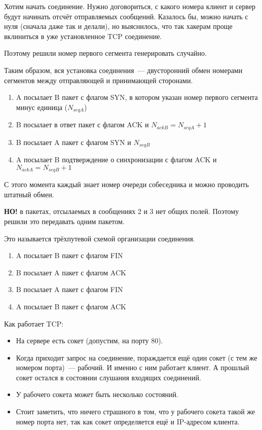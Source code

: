 
Хотим начать соединение. Нужно договориться, с какого номера клиент и сервер будут начинать отсчёт отправляемых сообщений. Казалось бы, можно начать с нуля (сначала даже так и делали), но выяснилось, что так хакерам проще вклиниться в уже установленное TCP соединение.

Поэтому решили номер первого сегмента генерировать случайно. 

Таким образом, вся установка соединения~--- двусторонний обмен номерами сегментов между отправляющей и принимающей сторонами.

\begin{enumerate}
    \item A посылает B пакет с флагом SYN, в котором указан номер первого сегмента минус единица ($N_{seqA}$)
    \item B посылает в ответ пакет с флагом ACK и $N_{ackB}=N_{seqA}+1$
    \item B посылает A пакет с флагом SYN и $N_{seqB}$
    \item A посылает B подтверждение о синхронизации с флагом ACK и $N_{ackA}=N_{seqB}+1$
\end{enumerate}

С этого момента каждый знает номер очереди собеседника и можно проводить штатный обмен.

{\bf НО!} в пакетах, отсылаемых в сообщениях 2 и 3 нет общих полей. Поэтому решили это передавать одним пакетом.

Это называется трёхпутевой схемой организации соединения.


\begin{enumerate}
    \item A посылает B пакет с флагом FIN
    \item B посылает A пакет с флагом ACK 
    \item B посылает A пакет с флагом FIN
    \item A посылает B пакет с флагом ACK
\end{enumerate}


Как работает TCP:

\begin{itemize}
    \item На сервере есть сокет (допустим, на порту 80).
    \item Когда приходит запрос на соединение, пораждается ещё один сокет (с тем же номером порта)~--- рабочий. И именно с ним работает клиент. А прошлый сокет остался в состоянии слушания входящих соединений.
    \item У рабочего сокета может быть несколько состояний.
    \item Стоит заметить, что ничего страшного в том, что у рабочего сокета такой же номер порта нет, так как сокет определяется ещё и IP-адресом клиента.
\end{itemize}

